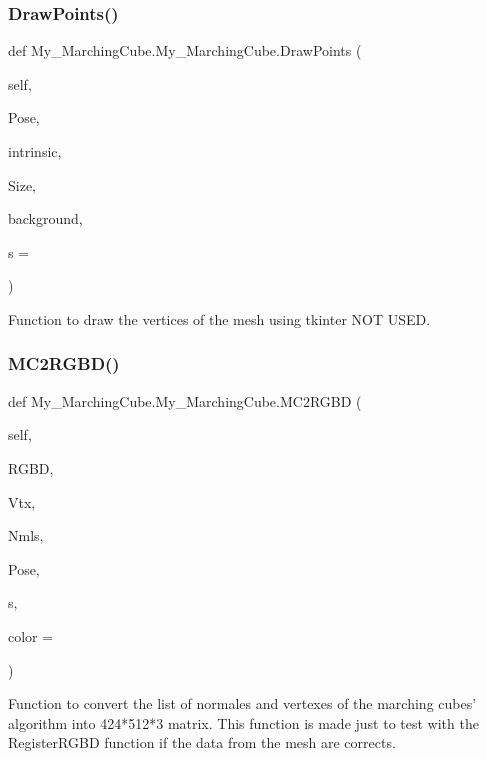 \subsubsection{\texorpdfstring{Draw\+Points()}{DrawPoints()}}
{\footnotesize\ttfamily def My\+\_\+\+Marching\+Cube.\+My\+\_\+\+Marching\+Cube.\+Draw\+Points (\begin{DoxyParamCaption}\item[{}]{self,  }\item[{}]{Pose,  }\item[{}]{intrinsic,  }\item[{}]{Size,  }\item[{}]{background,  }\item[{}]{s = {} }\end{DoxyParamCaption})}

\begin{DoxyVerb}    Function to draw the vertices of the mesh using tkinter
    NOT USED.
\end{DoxyVerb}
 \mbox{\label{class_my___marching_cube_1_1_my___marching_cube_aaf418aa2b8358d872fc53616408acdf6}} 
\subsubsection{\texorpdfstring{M\+C2\+R\+G\+B\+D()}{MC2RGBD()}}
{\footnotesize\ttfamily def My\+\_\+\+Marching\+Cube.\+My\+\_\+\+Marching\+Cube.\+M\+C2\+R\+G\+BD (\begin{DoxyParamCaption}\item[{}]{self,  }\item[{}]{R\+G\+BD,  }\item[{}]{Vtx,  }\item[{}]{Nmls,  }\item[{}]{Pose,  }\item[{}]{s,  }\item[{}]{color = {} }\end{DoxyParamCaption})}

\begin{DoxyVerb}    Function to convert the list of normales and vertexes of the marching cubes' algorithm into
    424*512*3 matrix.
    This function is made just to test with the RegisterRGBD function if the data from the mesh are corrects.
\end{DoxyVerb}
 \mbox{\label{class_my___marching_cube_1_1_my___marching_cube_a234beb0a06a023ee9d4571d569af755c}} 
